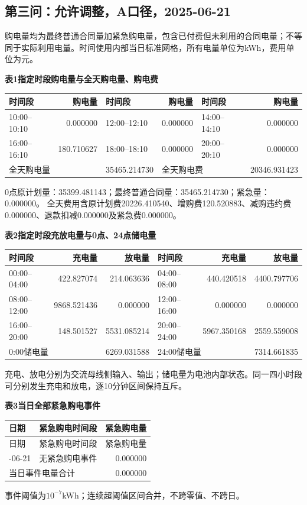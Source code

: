 \subsection{第三问：允许调整，A口径，2025-06-21}
\begingroup\small
\setlength{\tabcolsep}{4pt}\renewcommand{\arraystretch}{1.08}
\setlength{\LTpre}{4pt}\setlength{\LTpost}{4pt}
\noindent 购电量均为最终普通合同量加紧急购电量，包含已付费但未利用的合同电量；不等同于实际利用电量。时间使用内部当日标准网格，所有电量单位为kWh，费用单位为元。
\begin{center}\textbf{表1\quad 指定时段购电量与全天购电量、购电费}\par\smallskip
\begin{tabular}{lr lr lr}\toprule
时间段 & 购电量 & 时间段 & 购电量 & 时间段 & 购电量\\\midrule
10:00--10:10 & 0.000000 & 12:00--12:10 & 0.000000 & 14:00--14:10 & 0.000000\\
16:00--16:10 & 180.710627 & 18:00--18:10 & 0.000000 & 20:00--20:10 & 0.000000\\
\midrule
\multicolumn{2}{l}{全天购电量} & 35465.214730 & \multicolumn{2}{l}{全天购电费} & 20346.931423\\
\bottomrule\end{tabular}\end{center}
\noindent 0点原计划量：35399.481143；最终普通合同量：35465.214730；紧急量：0.000000。
全天费用含原计划费20226.410540、增购费120.520883、减购违约费0.000000、退款扣减0.000000及紧急费0.000000。
\begin{center}\textbf{表2\quad 指定时段充放电量与0点、24点储电量}\par\smallskip
\begin{tabular}{lrr lrr}\toprule
时间段 & 充电量 & 放电量 & 时间段 & 充电量 & 放电量\\\midrule
00:00--04:00 & 422.827074 & 214.063636 & 04:00--08:00 & 440.420518 & 4400.797706\\
08:00--12:00 & 9868.521436 & 0.000000 & 12:00--16:00 & 0.000000 & 0.000000\\
16:00--20:00 & 148.501527 & 5531.085214 & 20:00--24:00 & 5967.350168 & 2559.559008\\
\midrule
\multicolumn{2}{l}{0:00储电量} & 6269.031588 & \multicolumn{2}{l}{24:00储电量} & 7314.661835\\
\bottomrule\end{tabular}\end{center}
\noindent 充电、放电分别为交流母线侧输入、输出；储电量为电池内部状态。同一四小时段可分别发生充电和放电，逐10分钟区间保持互斥。
\begin{center}\textbf{表3\quad 当日全部紧急购电事件}\end{center}
\begin{longtable}{llr}\toprule 日期 & 紧急购电时间段 & 紧急购电量\\\midrule\endfirsthead
\toprule 日期 & 紧急购电时间段 & 紧急购电量\\\midrule\endhead
\bottomrule\endfoot
2025-06-21 & 无紧急购电事件 & 0.000000\\
\midrule\multicolumn{2}{l}{当日事件电量合计} & 0.000000\\
\end{longtable}
\noindent 事件阈值为$10^{-7}$kWh；连续超阈值区间合并，不跨零值、不跨日。
\endgroup
\clearpage
